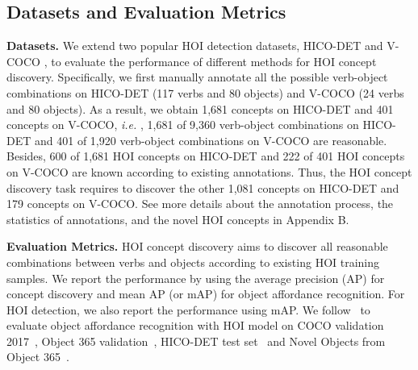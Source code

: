 \documentclass[runningheads]{llncs}
\newcommand{\ie}{\textit{i.e. }}
\begin{document}
\subsection{Datasets and Evaluation Metrics}

\textbf{Datasets.} We extend two popular HOI detection datasets, HICO-DET \cite{chao2018learning} and V-COCO \cite{gupta2015visual}, to evaluate the performance of different methods for HOI concept discovery. Specifically, we first manually annotate all the possible verb-object combinations on HICO-DET (117 verbs and 80 objects) and V-COCO (24 verbs and 80 objects). As a result, we obtain 1,681 concepts on HICO-DET and 401 concepts on V-COCO, \ie, 1,681 of 9,360 verb-object combinations on HICO-DET and 401 of 1,920 verb-object combinations on V-COCO are reasonable. Besides, 600 of 1,681 HOI concepts on HICO-DET and 222 of 401 HOI concepts on V-COCO are known according to existing annotations. Thus, the HOI concept discovery task requires to discover the other 1,081 concepts on HICO-DET and 179 concepts on V-COCO. See more details about the annotation process, the statistics of annotations, and the novel HOI concepts in Appendix B.

\textbf{Evaluation Metrics.} HOI concept discovery aims to discover all reasonable combinations between verbs and objects according to existing HOI training samples. We report the performance by using the average precision (AP) for concept discovery and mean AP (or mAP) for object affordance recognition. For HOI detection, we also report the performance using mAP. We follow~\cite{hou2021atl} to evaluate object affordance recognition with HOI model on COCO validation 2017~\cite{lin2014microsoft}, Object 365 validation~\cite{Shao2020Objects365}, HICO-DET test set~\cite{chao2018learning} and Novel Objects from Object 365~\cite{Shao2020Objects365}.
\end{document}
